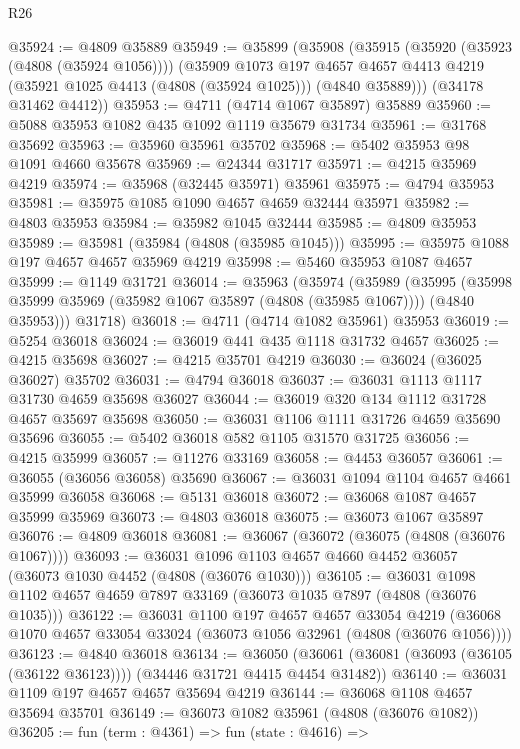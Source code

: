 \begin{lexlean}{R26}
\begin{coremodule}
@35924 := @4809 @35889
@35949 := @35899
    (@35908
      (@35915
        (@35920 (@35923 (@4808 (@35924 @1056))))
        (@35909
          @1073
          @197
          @4657
          @4657
          @4413
          @4219
          (@35921 @1025 @4413 (@4808 (@35924 @1025)))
          (@4840 @35889)))
      (@34178 @31462 @4412))
@35953 := @4711 (@4714 @1067 @35897) @35889
@35960 := @5088 @35953 @1082 @435 @1092 @1119 @35679 @31734
@35961 := @31768 @35692
@35963 := @35960 @35961 @35702
@35968 := @5402 @35953 @98 @1091 @4660 @35678
@35969 := @24344 @31717
@35971 := @4215 @35969 @4219
@35974 := @35968 (@32445 @35971) @35961
@35975 := @4794 @35953
@35981 := @35975 @1085 @1090 @4657 @4659 @32444 @35971
@35982 := @4803 @35953
@35984 := @35982 @1045 @32444
@35985 := @4809 @35953
@35989 := @35981 (@35984 (@4808 (@35985 @1045)))
@35995 := @35975 @1088 @197 @4657 @4657 @35969 @4219
@35998 := @5460 @35953 @1087 @4657
@35999 := @1149 @31721
@36014 := @35963
    (@35974
      (@35989
        (@35995 (@35998 @35999 @35969 (@35982 @1067 @35897 (@4808 (@35985 @1067)))) (@4840 @35953)))
      @31718)
@36018 := @4711 (@4714 @1082 @35961) @35953
@36019 := @5254 @36018
@36024 := @36019 @441 @435 @1118 @31732 @4657
@36025 := @4215 @35698
@36027 := @4215 @35701 @4219
@36030 := @36024 (@36025 @36027) @35702
@36031 := @4794 @36018
@36037 := @36031 @1113 @1117 @31730 @4659 @35698 @36027
@36044 := @36019 @320 @134 @1112 @31728 @4657 @35697 @35698
@36050 := @36031 @1106 @1111 @31726 @4659 @35690 @35696
@36055 := @5402 @36018 @582 @1105 @31570 @31725
@36056 := @4215 @35999
@36057 := @11276 @33169
@36058 := @4453 @36057
@36061 := @36055 (@36056 @36058) @35690
@36067 := @36031 @1094 @1104 @4657 @4661 @35999 @36058
@36068 := @5131 @36018
@36072 := @36068 @1087 @4657 @35999 @35969
@36073 := @4803 @36018
@36075 := @36073 @1067 @35897
@36076 := @4809 @36018
@36081 := @36067 (@36072 (@36075 (@4808 (@36076 @1067))))
@36093 := @36031 @1096 @1103 @4657 @4660 @4452 @36057 (@36073 @1030 @4452 (@4808 (@36076 @1030)))
@36105 := @36031 @1098 @1102 @4657 @4659 @7897 @33169 (@36073 @1035 @7897 (@4808 (@36076 @1035)))
@36122 := @36031
    @1100
    @197
    @4657
    @4657
    @33054
    @4219
    (@36068 @1070 @4657 @33054 @33024 (@36073 @1056 @32961 (@4808 (@36076 @1056))))
@36123 := @4840 @36018
@36134 := @36050
    (@36061 (@36081 (@36093 (@36105 (@36122 @36123)))) (@34446 @31721 @4415 @4454 @31482))
@36140 := @36031 @1109 @197 @4657 @4657 @35694 @4219
@36144 := @36068 @1108 @4657 @35694 @35701
@36149 := @36073 @1082 @35961 (@4808 (@36076 @1082))
@36205 := fun (term : @4361) =>
  fun (state : @4616) =>

\end{coremodule}
\end{lexlean}
